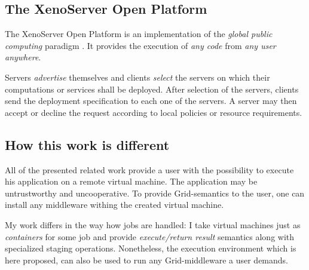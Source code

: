 \subsection{The XenoServer Open Platform}

The  XenoServer Open  Platform is  an implementation  of  the \emph{global
  public   computing}  paradigm   \cite{kotsovinos05}.  It   provides  the
execution of \emph{any code} from \emph{any user} \emph{anywhere}.

Servers \emph{advertise} themselves  and clients \emph{select} the servers
on which their computations or services shall be deployed. After selection
of the servers,  clients send the deployment specification  to each one of
the servers. A server may then  accept or decline the request according to
local policies or resource requirements.


\subsection{How this work is different}

All of the  presented related work provide a user  with the possibility to
execute his application on a  remote virtual machine.  The application may
be untrustworthy and uncooperative. To provide Grid-semantics to the user,
one can install any middleware withing the created virtual machine.

My work differs  in the way how jobs are handled:  I take virtual machines
just as  \emph{containers} for  some job and  provide \emph{execute/return
  result}      semantics      along      with     specialized      staging
operations. Nonetheless, the execution environment which is here proposed,
can also be used to run any Grid-middleware a user demands.


